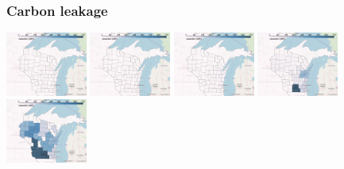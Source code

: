 \documentclass[xcolor=dvipsnames]{beamer}
\begin{document}
\begin{frame}
  \frametitle{Carbon leakage}



  \includegraphics[width=0.2\textwidth]{includes/no_leakage_wind_r0.png}
  \includegraphics[width=0.2\textwidth]{includes/no_leakage_wind_r1.png}
  \includegraphics[width=0.2\textwidth]{includes/no_leakage_wind_r2.png}
  \includegraphics[width=0.2\textwidth]{includes/no_leakage_wind_r3.png}
  \includegraphics[width=0.2\textwidth]{includes/no_leakage_wind_r4.png}

\end{frame}




\end{document}
